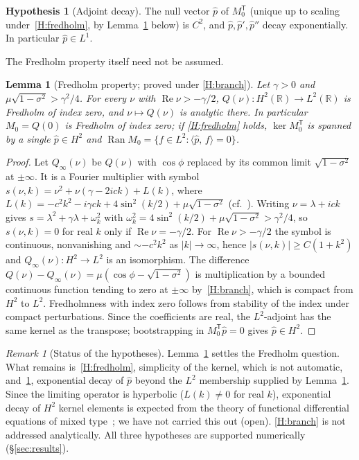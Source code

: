 \documentclass[11pt]{article}
\theoremstyle{plain}
\newtheorem{lemma}[theorem]{Lemma}
\theoremstyle{definition}
\newtheorem{hypothesis}{Hypothesis}
\theoremstyle{remark}
\newtheorem{remark}[theorem]{Remark}
\newcommand{\ip}[2]{\langle #1,\,#2\rangle}
\newcommand{\ph}{\hat p}
\newcommand{\R}{\mathbb{R}}
\newcommand{\T}{\mathsf T}
\newcommand{\tagC}[1]{\textsf{proved under #1}}
\newcommand{\tagO}{\textsf{open}}
\begin{document}
\begin{hypothesis}[Adjoint decay]\label{H:adjoint}
The null vector $\ph$ of $M_0^{\T}$ (unique up to scaling under~\ref{H:fredholm}, by
Lemma~\ref{lem:fredholm} below) is $C^2$, and $\ph,\ph',\ph''$ decay exponentially. In
particular $\ph\in L^1$.
\end{hypothesis}

The Fredholm property itself need not be assumed.

\begin{lemma}[Fredholm property; \tagC{\ref{H:branch}}]\label{lem:fredholm}
Let $\gamma>0$ and $\mu\sqrt{1-\sigma^2}>\gamma^2/4$. For every $\nu$ with
$\operatorname{Re}\nu>-\gamma/2$, $Q(\nu):H^2(\R)\to L^2(\R)$ is Fredholm of index zero, and
$\nu\mapsto Q(\nu)$ is analytic there. In particular $M_0=Q(0)$ is Fredholm of index zero; if
\ref{H:fredholm} holds, $\ker M_0^{\T}$ is spanned by a single $\ph\in H^2$ and
$\operatorname{Ran}M_0=\{f\in L^2:\ip{\ph}{f}=0\}$.
\end{lemma}

\begin{proof}
Let $Q_\infty(\nu)$ be $Q(\nu)$ with $\cos\phi$ replaced by its common limit
$\sqrt{1-\sigma^2}$ at $\pm\infty$. It is a Fourier multiplier with symbol
$s(\nu,k)=\nu^2+\nu(\gamma-2ick)+L(k)$, where
$L(k)=-c^2k^2-i\gamma ck+4\sin^2(k/2)+\mu\sqrt{1-\sigma^2}$ (cf.~\cite[eq.~(7)]{VCKX20}).
Writing $\nu=\lambda+ick$ gives $s=\lambda^2+\gamma\lambda+\omega_k^2$ with
$\omega_k^2=4\sin^2(k/2)+\mu\sqrt{1-\sigma^2}>\gamma^2/4$, so $s(\nu,k)=0$ for real $k$ only if
$\operatorname{Re}\nu=-\gamma/2$. For $\operatorname{Re}\nu>-\gamma/2$ the symbol is continuous,
nonvanishing and $\sim-c^2k^2$ as $|k|\to\infty$, hence $|s(\nu,k)|\ge C(1+k^2)$ and
$Q_\infty(\nu):H^2\to L^2$ is an isomorphism. The difference
$Q(\nu)-Q_\infty(\nu)=\mu(\cos\phi-\sqrt{1-\sigma^2})$ is multiplication by a bounded
continuous function tending to zero at $\pm\infty$ by~\ref{H:branch}, which is compact from
$H^2$ to $L^2$. Fredholmness with index zero follows from stability of the index under
compact perturbations. Since the coefficients are real, the $L^2$-adjoint has the same
kernel as the transpose; bootstrapping in $M_0^{\T}\ph=0$ gives $\ph\in H^2$.
\end{proof}

\begin{remark}[Status of the hypotheses]\label{rem:hyp}
Lemma~\ref{lem:fredholm} settles the Fredholm question. What remains is~\ref{H:fredholm},
simplicity of the kernel, which is not automatic, and~\ref{H:adjoint}, exponential decay of
$\ph$ beyond the $L^2$ membership supplied by Lemma~\ref{lem:fredholm}. Since the limiting
operator is hyperbolic ($L(k)\neq0$ for real $k$), exponential decay of $H^2$ kernel elements
is expected from the theory of functional differential equations of mixed
type~\cite{MP99}; we have not carried this out (\tagO). \ref{H:branch} is not addressed
analytically. All three hypotheses are supported numerically (\S\ref{sec:results}).
\end{remark}
\end{document}
